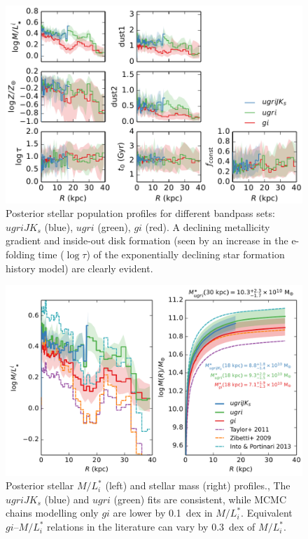 \documentclass{iau}
\begin{document}
\begin{figure}
\centering
\includegraphics[width=0.7\columnwidth]{pop_profile} 
\caption{Posterior stellar population profiles for different bandpass sets: $ugriJK_s$ (blue), $ugri$ (green), $gi$ (red).
A declining metallicity gradient and inside-out disk formation (seen by an increase in the e-folding time ($\log \tau$) of the exponentially declining star formation history model) are clearly evident.}
\label{fig:pop_profile}
\end{figure}

\begin{figure}
\centering
\includegraphics[width=0.7\columnwidth]{mass_profile} 
\caption{Posterior stellar $M/L_i^*$ (left) and stellar mass (right) profiles.,
The $ugriJK_s$ (blue) and $ugri$ (green) fits are consistent, while MCMC chains modelling only $gi$ are lower by 0.1~dex in $M/L_i^*$.
Equivalent $gi$--$M/L_i^*$ relations in the literature can vary by 0.3~dex of $M/L_i^*$.}
\label{fig:mass_profile}
\end{figure}
\end{document}
